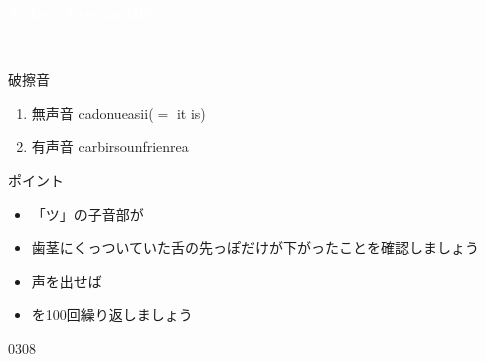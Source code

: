 \documentclass[aspectratio=169,xcolor={dvipsnames,table}]{beamer}
\begin{document}
\begin{frame}
\centering
  \textcolor{white}{\Huge\bfseries Today's Pronunciation}\pause

 \vspace{30pt}

  \textcolor{white}{\Huge\bfseries {}, }


\end{frame}
 \begin{frame}[plain,label=slide_ts_dz]{破擦音\,\,\,}

\large

\begin{enumerate}
 \item  無声音 \hspace{20pt}ca\hspace{1\zw}donu\hspace{1\zw}ea\hspace{1\zw}si\hspace{1\zw}i($=$ it is)
 \item  有声音 \hspace{20pt}car\hspace{1\zw}bir\hspace{1\zw}soun\hspace{1\zw}frien\hspace{1\zw}rea
\end{enumerate}

\vspace*{20pt}

\normalsize
ポイント

\begin{itemize}[circle]
 \item 「ツ」の子音部が
 \item 歯茎にくっついていた舌の先っぽだけが下がったことを確認しましょう
 \item 声を出せば
 \item {}を100回繰り返しましょう
\end{itemize}
\hfill{\tiny 0308}\,{\scriptsize {}}
\end{frame}
\end{document}
